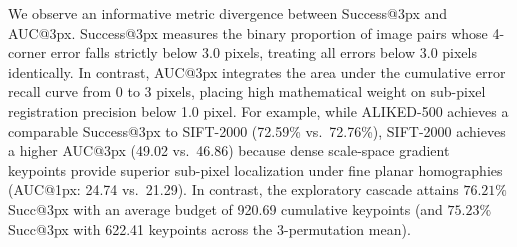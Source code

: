 \documentclass[conference]{IEEEtran}
\begin{document}
We observe an informative metric divergence between Success@3px and AUC@3px. Success@3px measures the binary proportion of image pairs whose 4-corner error falls strictly below 3.0 pixels, treating all errors below 3.0 pixels identically. In contrast, AUC@3px integrates the area under the cumulative error recall curve from 0 to 3 pixels, placing high mathematical weight on sub-pixel registration precision below 1.0 pixel. For example, while ALIKED-500 achieves a comparable Success@3px to SIFT-2000 (72.59\% vs.\ 72.76\%), SIFT-2000 achieves a higher AUC@3px (49.02 vs.\ 46.86) because dense scale-space gradient keypoints provide superior sub-pixel localization under fine planar homographies (AUC@1px: 24.74 vs.\ 21.29). In contrast, the exploratory cascade attains $76.21\%$ Succ@3px with an average budget of 920.69 cumulative keypoints (and $75.23\%$ Succ@3px with 622.41 keypoints across the 3-permutation mean).
\end{document}
